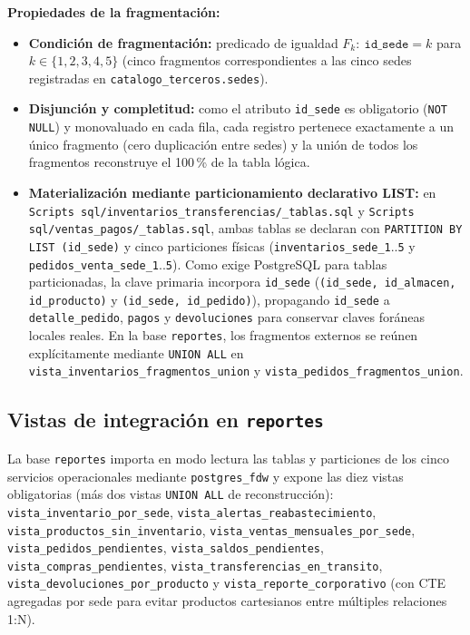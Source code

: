 \documentclass[11pt,oneside]{article}
\begin{document}
\noindent\textbf{Propiedades de la fragmentaci\'on:}
\begin{itemize}[leftmargin=1.5em, itemsep=2.5pt]
  \item \textbf{Condici\'on de fragmentaci\'on:} predicado de igualdad
        $F_k:\ \texttt{id\_sede} = k$ para $k \in \{1, 2, 3, 4, 5\}$ (cinco
        fragmentos correspondientes a las cinco sedes registradas en
        \texttt{catalogo\_terceros.sedes}).
  \item \textbf{Disjunci\'on y completitud:} como el atributo \texttt{id\_sede}
        es obligatorio (\texttt{NOT NULL}) y monovaluado en cada fila, cada
        registro pertenece exactamente a un \'unico fragmento (cero duplicaci\'on
        entre sedes) y la uni\'on de todos los fragmentos reconstruye el 100\,\%
        de la tabla l\'ogica.
  \item \textbf{Materializaci\'on mediante particionamiento declarativo LIST:} en
        \texttt{Scripts sql/\allowbreak inventarios\_transferencias/\_tablas.sql} y \texttt{Scripts sql/\allowbreak ventas\_pagos/\_tablas.sql}, ambas tablas se declaran con
        \texttt{PARTITION BY LIST (id\_sede)} y cinco particiones f\'isicas
        (\texttt{inventarios\_sede\_1}..\texttt{5} y
        \texttt{pedidos\_venta\_sede\_1}..\texttt{5}). Como exige PostgreSQL
        para tablas particionadas, la clave primaria incorpora \texttt{id\_sede}
        (\texttt{(id\_sede, id\_almacen, id\_producto)} y \texttt{(id\_sede,
        id\_pedido)}), propagando \texttt{id\_sede} a \texttt{detalle\_pedido},
        \texttt{pagos} y \texttt{devoluciones} para conservar claves for\'aneas
        locales reales. En la base \texttt{reportes}, los fragmentos externos se
        re\'unen expl\'icitamente mediante \texttt{UNION ALL} en
        \texttt{vista\_inventarios\_\allowbreak fragmentos\_union} y
        \texttt{vista\_pedidos\_\allowbreak fragmentos\_union}.
\end{itemize}

\subsection{Vistas de integraci\'on en \texttt{reportes}}

La base \texttt{reportes} importa en modo lectura las tablas y particiones de
los cinco servicios operacionales mediante \texttt{postgres\_fdw} y expone las
diez vistas obligatorias (m\'as dos vistas \texttt{UNION ALL} de reconstrucci\'on):
\texttt{vista\_\allowbreak inventario\_\allowbreak por\_sede},
\texttt{vista\_\allowbreak alertas\_\allowbreak reabastecimiento},
\texttt{vista\_\allowbreak productos\_\allowbreak sin\_inventario},
\texttt{vista\_\allowbreak ventas\_\allowbreak mensuales\_por\_sede},
\texttt{vista\_\allowbreak pedidos\_\allowbreak pendientes},
\texttt{vista\_\allowbreak saldos\_\allowbreak pendientes},
\texttt{vista\_\allowbreak compras\_\allowbreak pendientes},
\texttt{vista\_\allowbreak transferencias\_\allowbreak en\_transito},
\texttt{vista\_\allowbreak devoluciones\_\allowbreak por\_producto} y
\texttt{vista\_\allowbreak reporte\_\allowbreak corporativo} (con CTE agregadas por sede
para evitar productos cartesianos entre m\'ultiples relaciones 1:N).
\end{document}
